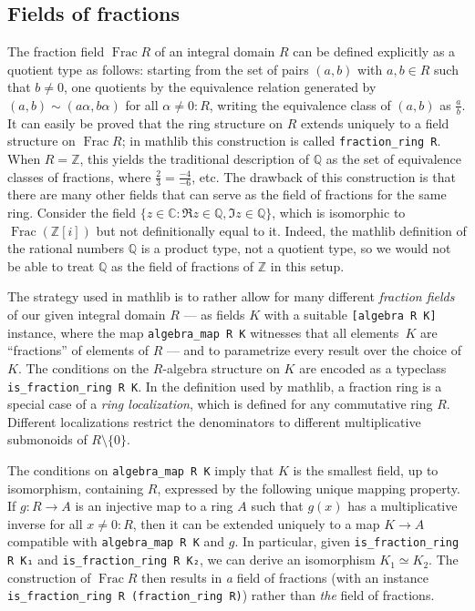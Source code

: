 \documentclass[sn-mathphys]{sn-jnl}%
\renewcommand{\C}{\mathbb{C}}
\newcommand{\lean}[1]{\texttt{#1}\xspace}
\newcommand{\mathlib}{\textsf{mathlib}\xspace}
\newcommand{\QQ}{\mathbb{Q}}
\renewcommand{\Z}{\mathbb{Z}}
\DeclareMathOperator{\Frac}{Frac}
\begin{document}
\subsection{Fields of fractions}\label{subsection : fields of fractions}
The fraction field $\Frac R$ of an integral domain $R$ can be defined explicitly as a quotient type as follows:
starting from the set of pairs $(a,b)$ with $a,b \in R$ such that $b\neq 0$,
one quotients by the equivalence relation generated by $(a,b) \sim (a \alpha, b \alpha)$ for all $\alpha \ne 0 : R$, writing the equivalence class of $(a,b)$ as $\frac{a}{b}$.
It can easily be proved that the ring structure on $R$ extends uniquely to a field structure on $\Frac R$;
in \mathlib this construction is called \mbox{\lean{fraction\_ring R}}.
When $R=\Z$, this yields the traditional description of $\QQ$ as the set of equivalence classes of fractions, where $\frac{2}{3}=\frac{-4}{-6}$, etc.
The drawback of this construction is that there are many other fields that can serve as the field of fractions for the same ring.
Consider the field $\{z \in \C : \Re z \in \QQ, \Im z\in\QQ\}$, which is isomorphic to $\Frac (\Z[i])$ but not definitionally equal to it.
Indeed, the \mathlib definition of the rational numbers $\QQ$ is a product type, not a quotient type, so we would not be able to treat $\QQ$ as the field of fractions of $\Z$ in this setup.

The strategy used in \mathlib is to rather allow for many different \emph{fraction fields} of our given integral domain $R$ --- as fields $K$ with a suitable \lean{[algebra R K]} instance, where the map \lean{algebra\_map R K} witnesses that all elements~$K$ are ``fractions'' of elements of $R$ --- and to parametrize every result over the choice of $K$.
The conditions on the $R$-algebra structure on $K$ are encoded as a typeclass \lean{is\_fraction\_ring R K}.
In the definition used by \mathlib, a fraction ring is a special case of a \emph{ring localization},
which is defined for any commutative ring $R$.
Different localizations restrict the denominators to different multiplicative submonoids of $R\setminus\{0\}$.

The conditions on \lean{algebra\_map R K} imply that $K$ is the smallest field, up to isomorphism, containing $R$, expressed by the following unique mapping property.
If $g \colon R \to A$ is an injective map to a ring $A$ such that $g(x)$ has a multiplicative inverse for all $x \ne 0 : R$, then
it can be extended uniquely to a map $K \to A$ compatible with \lean{algebra\_map R K} and $g$.
In particular, given \lean{is\_fraction\_ring R K₁} and \lean{is\_fraction\_ring R K₂}, we can derive an isomorphism $K_1 \simeq K_2$.
The construction of $\Frac R$ then results in \emph{a} field of fractions (with an instance \lean{is\_fraction\_ring R (fraction\_ring R)}) rather than \emph{the} field of fractions.
\end{document}
